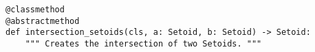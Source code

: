 \par\begin{minipage}{62ex}
\begin{verbatim}
@classmethod
@abstractmethod
def intersection_setoids(cls, a: Setoid, b: Setoid) -> Setoid:
    """ Creates the intersection of two Setoids. """
\end{verbatim}
\end{minipage}\par